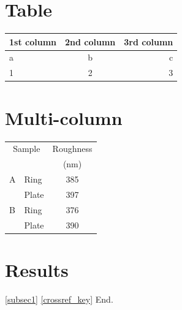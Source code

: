 \documentclass[a4paper,12pt]{article}
\begin{document}
\section{Table}
\begin{table}[h]
\centering
\begin{tabular}{|l|c|r|}
\hline
1st column&2nd column&3rd column\\
\hline
a & b & c\\
\cline{2-3}
1 & 2 & 3\\
\hline
\end{tabular}
\end{table}

\section{Multi-column}
\begin{table}[h]
\centering
\begin{tabular}{llc}
\hline%
\multicolumn{2}{c}{Sample} & Roughness\\
 & & (nm)\\
\hline%
A & Ring & 385\\
\cline{2-3}
 & Plate & 397\\
\hline
B & Ring & 376\\
\cline{2-3}
 & Plate & 390\\
\hline
\end{tabular}
\end{table}



\section{Results}
\ref{subsec1}
\newline
\ref{crossref_key}
\newline
End.
\end{document}
